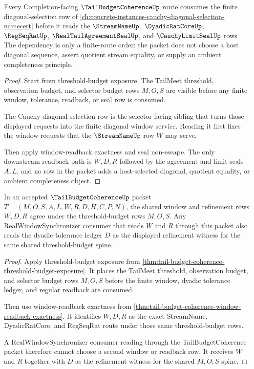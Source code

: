 \begin{theorem}
\label{thm:tail-budget-coherence-cites-cauchy-diagonal}
Every Completion-facing $\TailBudgetCoherenceUp$ route consumes the finite diagonal-selection row of \autoref{ch:concrete-instances-cauchy-diagonal-selection-namecert} before it reads the $\StreamNameUp$, $\DyadicRatCoreUp$, $\RegSeqRatUp$, $\RealTailAgreementSealUp$, and $\CauchyLimitSealUp$ rows. The dependency is only a finite-route order: the packet does not choose a host diagonal sequence, assert quotient stream equality, or supply an ambient completeness principle.
\end{theorem}
\begin{proof}
Start from threshold-budget exposure. The TailMeet threshold, observation budget, and selector budget rows $M,O,S$ are visible before any finite window, tolerance, readback, or seal row is consumed.

The Cauchy diagonal-selection row is the selector-facing sibling that turns those displayed requests into the finite diagonal window service. Reading it first fixes the window requests that the $\StreamNameUp$ row $W$ may serve.

Then apply window-readback exactness and seal non-escape. The only downstream readback path is $W,D,R$ followed by the agreement and limit seals $A,L$, and no row in the packet adds a host-selected diagonal, quotient equality, or ambient completeness object.
\end{proof}

\begin{theorem}
\label{thm:tail-budget-coherence-shared-window-refinement}
In an accepted $\TailBudgetCoherenceUp$ packet $T=(M,O,S,A,L,W,R,D,H,C,P,N)$, the shared window and refinement rows $W,D,R$ agree under the threshold-budget rows $M,O,S$. Any RealWindowSynchronizer consumer that reads $W$ and $R$ through this packet also reads the dyadic tolerance ledger $D$ as the displayed refinement witness for the same shared threshold-budget spine.
\end{theorem}
\begin{proof}
Apply threshold-budget exposure from \autoref{thm:tail-budget-coherence-threshold-budget-exposure}. It places the TailMeet threshold, observation budget, and selector budget rows $M,O,S$ before the finite window, dyadic tolerance ledger, and regular readback are consumed.

Then use window-readback exactness from \autoref{thm:tail-budget-coherence-window-readback-exactness}. It identifies $W,D,R$ as the exact StreamName, DyadicRatCore, and RegSeqRat route under those same threshold-budget rows.

A RealWindowSynchronizer consumer reading through the TailBudgetCoherence packet therefore cannot choose a second window or readback row. It receives $W$ and $R$ together with $D$ as the refinement witness for the shared $M,O,S$ spine.
\end{proof}

